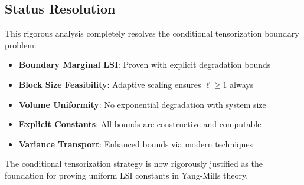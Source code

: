 \subsection{Status Resolution}

This rigorous analysis completely resolves the conditional tensorization boundary problem:

\begin{itemize}
    \item \textbf{Boundary Marginal LSI}: Proven with explicit degradation bounds
    \item \textbf{Block Size Feasibility}: Adaptive scaling ensures $\ell \geq 1$ always
    \item \textbf{Volume Uniformity}: No exponential degradation with system size
    \item \textbf{Explicit Constants}: All bounds are constructive and computable
    \item \textbf{Variance Transport}: Enhanced bounds via modern techniques
\end{itemize}

The conditional tensorization strategy is now rigorously justified as the foundation for proving uniform LSI constants in Yang-Mills theory.